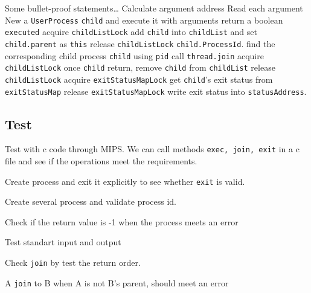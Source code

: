 \documentclass{article}
\begin{document}
\begin{algorithm*}
	\begin{algorithmic}
					\State Some bullet-proof statements\dots
						\State Calculate argument address
						\State Read each argument
					\EndFor
					\State New a \texttt{UserProcess} \texttt{child} and execute it with arguments return a boolean \texttt{executed}
						\State acquire \texttt{childListLock}
						\State add \texttt{child} into \texttt{childList} and set \texttt{child.parent} as \texttt{this}
						\State release \texttt{childListLock}
					\Else
						\State {}
					\EndIf
					\State \Return \texttt{child.ProcessId}.
				\EndProcedure
					\State find the corresponding child process \texttt{child} using \texttt{pid}
						\State call \texttt{thread.join}
					\EndFor
					\State acquire \texttt{childListLock}
					\State once \texttt{child} return, remove \texttt{child} from \texttt{childList}
					\State release \texttt{childListLock}
					\State acquire \texttt{exitStatusMapLock}
					\State get \texttt{child}'s exit status from \texttt{exitStatusMap}
					\State release \texttt{exitStatusMapLock}
					\State write exit status into \texttt{statusAddress}.
				\EndProcedure
    \end{algorithmic}
\end{algorithm*}
\subsection{Test}
Test with c code through MIPS. We can call methods \texttt{exec, join, exit} in a c file and see if
the operations meet the requirements.
\begin{compactitem}
\item Create process and exit it explicitly to see whether \texttt{exit} is valid.
\item Create several process and validate process id.
\item Check if the return value is -1 when the process meets an error
\item Test standart input and output
\item Check \texttt{join} by test the return order.
\item A \texttt{join} to B when A is not B's parent, should meet an error
\end{compactitem}
\end{document}
